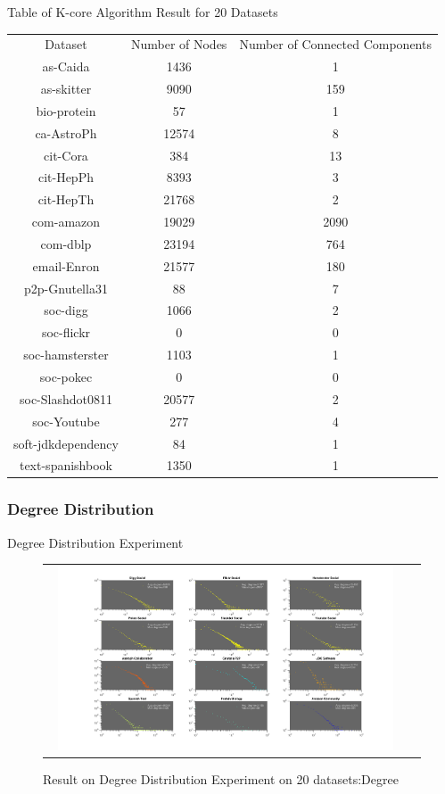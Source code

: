 \begin{center}
Table of K-core Algorithm Result for 20 Datasets
\begin{tabular}{ |c|c|c| }
 \hline
 Dataset & Number of Nodes & Number of Connected Components \\
  as-Caida & 1436 & 1 \\
  as-skitter & 9090 & 159 \\
  bio-protein & 57 & 1 \\
  ca-AstroPh & 12574 & 8 \\
  cit-Cora & 384 & 13 \\
  cit-HepPh & 8393 & 3 \\
  cit-HepTh & 21768 & 2 \\
  com-amazon & 19029 & 2090 \\
  com-dblp & 23194 & 764 \\
  email-Enron & 21577 & 180 \\
  p2p-Gnutella31 & 88 & 7 \\
  soc-digg & 1066 & 2 \\
  soc-flickr & 0 & 0 \\
  soc-hamsterster & 1103 & 1 \\
  soc-pokec & 0 & 0 \\
  soc-Slashdot0811 & 20577 & 2 \\
  soc-Youtube & 277 & 4 \\
  soft-jdkdependency & 84 & 1 \\
  text-spanishbook & 1350 & 1 \\
 \hline
\end{tabular}
\end{center}

\subsubsection{Degree Distribution}
Degree Distribution Experiment
\begin{figure}[H]
\begin{center}
\begin{tabular}{cc}
     \includegraphics[width=0.95\textwidth]{FIG/degree1.png}
\end{tabular}
\caption{Result on Degree Distribution Experiment on 20 datasets:Degree}
\end{center}
\end{figure}

